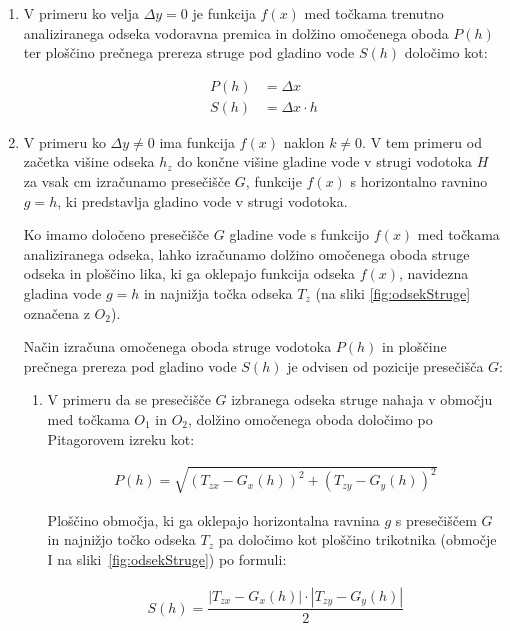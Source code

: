 \begin{enumerate}

\item V primeru ko velja $\Delta y = 0$ je funkcija $f(x)$ med točkama trenutno analiziranega odseka vodoravna premica in dolžino omočenega oboda $P(h)$ ter ploščino prečnega prereza struge pod gladino vode $S(h)$ določimo kot:

\begin{ceqn}
\begin{align}
P(h)&= \Delta x\\
S(h)&= \Delta x \cdot h
\end{align}
\end{ceqn}


\item V primeru ko $\Delta y \neq 0$ ima funkcija $f(x)$ naklon $k \neq 0$. V tem primeru od začetka višine odseka $h_z$ do končne višine gladine vode v strugi vodotoka $H$ za vsak cm izračunamo presečišče $G$, funkcije $f(x)$ s horizontalno ravnino $g = h$, ki predstavlja gladino vode v strugi vodotoka. 


Ko imamo določeno presečišče $G$ gladine vode s funkcijo $f(x)$ med točkama analiziranega odseka, lahko izračunamo dolžino omočenega oboda struge odseka in ploščino lika, ki ga oklepajo funkcija odseka $f(x)$, navidezna gladina vode $g = h$ in najnižja točka odseka $T_z$ (na sliki \ref{fig:odsekStruge} označena z $O_2$). 



Način izračuna omočenega oboda struge vodotoka $P(h)$ in ploščine prečnega prereza pod gladino vode $S(h)$ je odvisen od pozicije presečišča $G$:


\begin{enumerate}
	\item V primeru da se presečišče $G$ izbranega odseka struge nahaja v območju med točkama $O_1$ in $O_2$, dolžino omočenega oboda določimo po Pitagorovem izreku kot:
	
	\begin{ceqn}
		\begin{align}
		P(h) = \sqrt{(T_{zx} - G_x(h))^{2} + (T_{zy} - G_y(h))^{2}}
		\end{align}
	\end{ceqn}
	
	
	Ploščino območja, ki ga oklepajo horizontalna ravnina $g$ s presečiščem $G$ in najnižjo točko odseka $T_z$ pa določimo kot ploščino trikotnika (območje I na sliki~\ref{fig:odsekStruge}) po formuli:
	
	\begin{ceqn}
		\begin{align}
		S(h) = \dfrac{|T_{zx} - G_x(h)| \cdot |T_{zy} - G_y(h)|}{2}
		\end{align}
	\end{ceqn}
	

\end{enumerate}
\end{enumerate}
